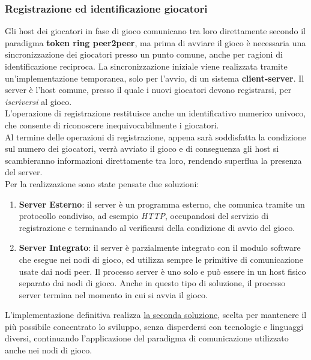 \documentclass[10pt,a4paper]{article}
\begin{document}
\subsubsection{Registrazione ed identificazione giocatori}
Gli host dei giocatori in fase di gioco  comunicano tra loro direttamente secondo il paradigma \textbf{token ring peer2peer}, ma prima di avviare il gioco è necessaria una sincronizzazione dei giocatori presso un punto comune, anche per ragioni di identificazione reciproca. La sincronizzazione iniziale viene realizzata tramite un'implementazione temporanea, solo per l'avvio, di un sistema \textbf{client-server}. Il server è l'host comune, presso il quale i nuovi giocatori devono registrarsi, per \textit{iscriversi} al gioco.\\ L'operazione di registrazione restituisce anche un identificativo numerico univoco, che consente di riconoscere inequivocabilmente i giocatori. \\ Al termine delle operazioni di registrazione, appena sarà soddisfatta la condizione sul numero dei giocatori, verrà avviato il gioco e di conseguenza gli host si scambieranno informazioni direttamente tra loro, rendendo superflua la presenza del server.\\ Per la realizzazione sono state pensate due soluzioni:
\begin{enumerate}
\item \textbf{Server Esterno}: il server è un programma esterno, che comunica tramite un protocollo condiviso, ad esempio \textit{HTTP}, occupandosi del servizio di registrazione e terminando al verificarsi della condizione di avvio del gioco.

\item \textbf{Server Integrato}: il server è parzialmente integrato con il modulo software che esegue nei nodi di gioco, ed utilizza sempre le primitive di comunicazione usate dai nodi peer. Il processo server è uno solo e può essere in un host fisico separato dai nodi di gioco. Anche in questo tipo di soluzione, il processo server termina nel momento in cui si avvia il gioco.
\end{enumerate}
L'implementazione definitiva realizza \underline{la seconda soluzione}, scelta per mantenere il più possibile concentrato lo sviluppo, senza disperdersi con tecnologie e linguaggi diversi, continuando  l'applicazione del paradigma di comunicazione utilizzato anche nei nodi di gioco.
\end{document}
